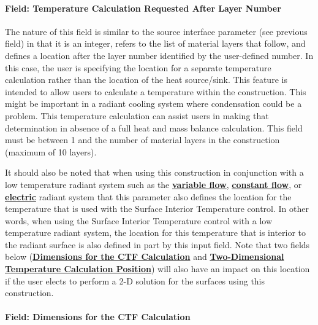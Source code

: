 \paragraph{Field: Temperature Calculation Requested After Layer Number}\label{field-temperature-calculation-requested-after-layer-number}

The nature of this field is similar to the source interface parameter (see previous field) in that it is an integer, refers to the list of material layers that follow, and defines a location after the layer number identified by the user-defined number. In this case, the user is specifying the location for a separate temperature calculation rather than the location of the heat source/sink. This feature is intended to allow users to calculate a temperature within the construction. This might be important in a radiant cooling system where condensation could be a problem. This temperature calculation can assist users in making that determination in absence of a full heat and mass balance calculation. This field must be between 1 and the number of material layers in the construction (maximum of 10 layers).

It should also be noted that when using this construction in conjunction with a low temperature radiant system such as the \textbf{\hyperref[zonehvaclowtemperatureradiantvariableflow]{variable flow}}, \textbf{\hyperref[zonehvaclowtemperatureradiantconstantflow]{constant flow}}, or \textbf{\hyperref[zonehvaclowtemperatureradiantelectric]{electric}} radiant system that this parameter also defines the location for the temperature that is used with the Surface Interior Temperature control.  In other words, when using the Surface Interior Temperature control with a low temperature radiant system, the location for this temperature that is interior to the radiant surface is also defined in part by this input field.  Note that two fields below (\textbf{\hyperref[field-dimensions-for-the-ctf-calculation]{Dimensions for the CTF Calculation}} and \textbf{\hyperref[field-two-dimensional-temperature-calculation-position]{Two-Dimensional Temperature Calculation Position}}) will also have an impact on this location if the user elects to perform a 2-D solution for the surfaces using this construction.

\paragraph{Field: Dimensions for the CTF Calculation}\label{field-dimensions-for-the-ctf-calculation}

